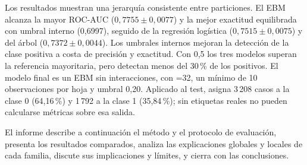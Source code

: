 Los resultados muestran una jerarquía consistente entre particiones. El EBM alcanza la mayor ROC-AUC ($0{,}7755 \pm 0{,}0077$) y la mejor exactitud equilibrada con umbral interno (0,6997), seguido de la regresión logística ($0{,}7515 \pm 0{,}0075$) y del árbol ($0{,}7372 \pm 0{,}0044$). Los umbrales internos mejoran la detección de la clase positiva a costa de precisión y exactitud. Con 0,5 los tres modelos superan la referencia mayoritaria, pero detectan menos del 30\,\% de los positivos. El modelo final es un EBM sin interacciones, con =32, un mínimo de 10 observaciones por hoja y umbral 0,20. Aplicado al test, asigna 3\,208 casos a la clase 0 (64,16\,\%) y 1\,792 a la clase 1 (35,84\,\%); sin etiquetas reales no pueden calcularse métricas sobre esa salida.

El informe describe a continuación el método y el protocolo de evaluación, presenta los resultados comparados, analiza las explicaciones globales y locales de cada familia, discute sus implicaciones y límites, y cierra con las conclusiones.
